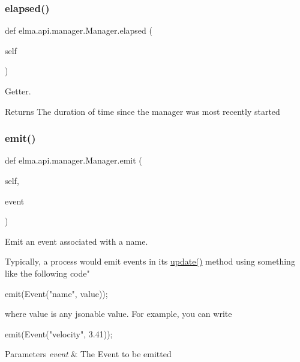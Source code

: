 \subsubsection{\texorpdfstring{elapsed()}{elapsed()}}
{\footnotesize\ttfamily def elma.\+api.\+manager.\+Manager.\+elapsed (\begin{DoxyParamCaption}\item[{}]{self }\end{DoxyParamCaption})}



Getter. 

\begin{DoxyReturn}{Returns}
The duration of time since the manager was most recently started 
\end{DoxyReturn}
\mbox{\label{classelma_1_1api_1_1manager_1_1Manager_a8c842ef67392a11900ce089e05b23c58}} 
\subsubsection{\texorpdfstring{emit()}{emit()}}
{\footnotesize\ttfamily def elma.\+api.\+manager.\+Manager.\+emit (\begin{DoxyParamCaption}\item[{}]{self,  }\item[{}]{event }\end{DoxyParamCaption})}



Emit an event associated with a name. 

Typically, a process would emit events in its \hyperlink{classelma_1_1api_1_1manager_1_1Manager_acb942259598dffdb074bea5171f0e2e9}{update()} method using something like the following code" 
\begin{DoxyCode}
emit(Event(\textcolor{stringliteral}{"name"}, value));
\end{DoxyCode}
 where value is any jsonable value. For example, you can write 
\begin{DoxyCode}
emit(Event(\textcolor{stringliteral}{"velocity"}, 3.41));
\end{DoxyCode}
 
\begin{DoxyParams}{Parameters}
{\em event} & The Event to be emitted \\
\hline
\end{DoxyParams}
\mbox{\label{classelma_1_1api_1_1manager_1_1Manager_a724e1c80f53aff3430bc465a5671ddee}} 
